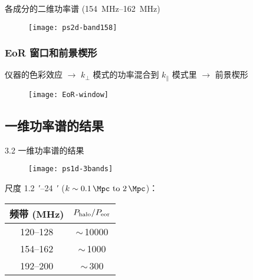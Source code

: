 \documentclass{beamer}
\begin{document}
\begin{frame}[t]
  \begin{alertblock}{各成分的二维功率谱
    {\normalfont (\SIrange{154}{162}{\MHz})}
  }
    \vspace{-1ex}
    \begin{figure}
      \centering
      \texttt{[image: ps2d-band158]}
    \end{figure}
  \end{alertblock}
\end{frame}

\begin{frame}[subsec]
  \frametitle{EoR 窗口和前景楔形}
  仪器的色彩效应 $\rightarrow$
  $k_{\perp}$ 模式的功率混合到 $k_{\parallel}$ 模式里 $\rightarrow$
  前景楔形
  \begin{figure}
    \centering
    \texttt{[image: EoR-window]}
  \end{figure}
\end{frame}

\subsection{一维功率谱的结果}

\begin{frame}{3.2 一维功率谱的结果}
  \begin{figure}
    \centering
    \texttt{[image: ps1d-3bands]}
  \end{figure}
  \vspace{-1ex}
  尺度 \SI{1.2}{\arcminute}--\SI{24}{\arcminute}
  ($k \sim \SIrange{0.1}{2}{\per\Mpc}$)：
  \vspace{-0.5ex}
  \begin{table}
    \centering
    \begin{tabular}{cc}
      \toprule
      频带 (\si{\MHz}) & $P_{\text{halo}} / P_{\text{eor}}$ \\
      \midrule
      120--128 & $\sim$\,\num{10000} \\
      154--162 & $\sim$\,1000 \\
      192--200 & $\sim$\,300 \\
      \bottomrule
    \end{tabular}
  \end{table}
\end{frame}

\end{document}
